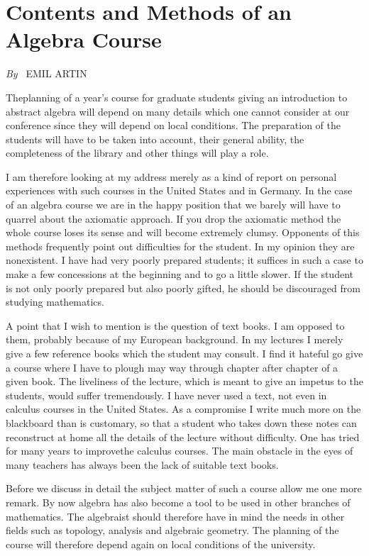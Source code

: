 
\chapter{Contents and Methods of an Algebra Course}

\begin{center}
{\em By~} EMIL ARTIN
\end{center}


\setcounter{pageoriginal}{4}
The\pageoriginale planning of a year's course for graduate students giving an
introduction to abstract algebra will depend on many details which one
cannot consider at our conference since they will depend on local
conditions. The preparation of the students will have to be taken into
account, their general ability, the completeness of the library and
other things will play a role.

I am therefore looking at my address merely as a kind of report on
personal experiences with such courses in the United States and in
Germany. In the case of an algebra course we are in the happy position
that we barely will have to quarrel about the axiomatic approach. If
you drop the axiomatic method the whole course loses its sense and
will become extremely clumsy. Opponents of this methods frequently
point out difficulties for the student. In my opinion they are
nonexistent. I have had very poorly prepared students; it suffices in
such a case to make a few concessions at the beginning and to go a
little slower. If the student is not only poorly prepared but also
poorly gifted, he should be discouraged from studying mathematics.

A point that I wish to mention is the question of text books. I am
opposed to them, probably because of my European background. In my
lectures I merely give a few reference books which the student may
consult. I find it hateful go give a course where I have to plough may
way through chapter after chapter of a given book. The liveliness of
the lecture, which is meant to give an impetus to the students, would
suffer tremendously. I have never used a text, not even in calculus
courses in the United States. As a compromise I write much more on the
blackboard than is customary, so that a student who takes down these
notes can reconstruct at home all the details of the lecture without
difficulty. One has tried for many years to improve\pageoriginale the calculus
courses. The main obstacle in the eyes of many teachers has always
been the lack of suitable text books.

Before we discuss in detail the subject matter of such a course allow
me one more remark. By now algebra has also become a tool to be used
in other branches of mathematics. The algebraist should therefore have
in mind the needs in other fields such as topology, analysis and
algebraic geometry. The planning of the course will therefore depend
again on local conditions of the university.

